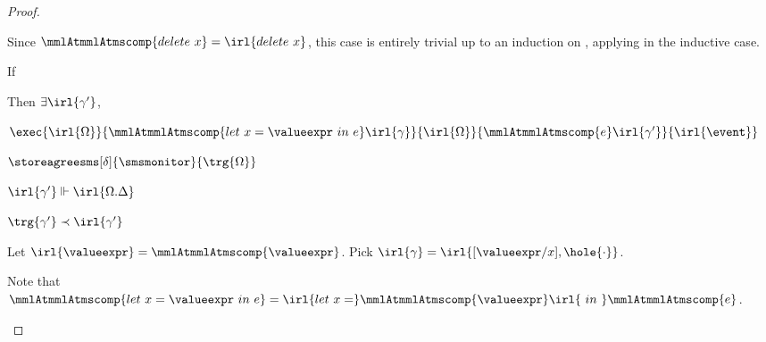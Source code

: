 \documentclass[a4paper,names,dvipsnames]{article}
\begin{document}
\begin{proof}
\begin{description}
          Since $\mmlAtmmlAtmscomp{delete\ x}=\irl{delete\ x}$, this case is entirely trivial up to an induction on , applying  in the inductive case.

          If
          Then $\exists \irl{\gamma'}$,
          \begin{goals}
            \item $\exec{\irl{\Omega}}{\mmlAtmmlAtmscomp{let\ x=\valueexpr\ in\ e}\irl{\gamma}}{\irl{\Omega}}{\mmlAtmmlAtmscomp{e}\irl{\gamma'}}{\irl{\event}}$
            \item $\storeagreesms[\delta]{\smsmonitor}{\trg{\Omega}}$
            \item $\irl{\gamma'}\Vdash\irl{\Omega.\Delta}$
            \item $\trg{\gamma'}\prec\irl{\gamma'}$
          \end{goals}
          Let $\irl{\valueexpr}=\mmlAtmmlAtmscomp{\valueexpr}$.
          Pick $\irl{\gamma}=\irl{[\valueexpr/x],\hole{\cdot}}$.

          Note that $\mmlAtmmlAtmscomp{let\ x=\valueexpr\ in\ e}=\irl{let\ x=}\mmlAtmmlAtmscomp{\valueexpr}\irl{\ in\ }\mmlAtmmlAtmscomp{e}$.


\end{description}
\end{proof}
\end{document}
